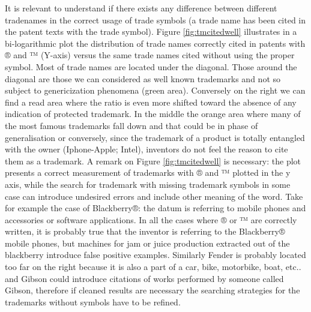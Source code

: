 \documentclass[b5paper,]{book}
\theoremstyle{definition}
\theoremstyle{definition}
\theoremstyle{definition}
\theoremstyle{remark}
\begin{document}
It is relevant to understand if there exists any difference between
different tradenames in the correct usage of trade symbols (a trade name
has been cited in the patent texts with the trade symbol). Figure
\ref{fig:tmcitedwell} illustrates in a bi-logarithmic plot the
distribution of trade names correctly cited in patents with ® and ™
(Y-axis) versus the same trade names cited without using the proper
symbol. Most of trade names are located under the diagonal. Those around
the diagonal are those we can considered as well known trademarks and
not so subject to genericization phenomena (green area). Conversely on
the right we can find a read area where the ratio is even more shifted
toward the absence of any indication of protected trademark. In the
middle the orange area where many of the most famous trademarks fall
down and that could be in phase of generalisation or conversely, since
the trademark of a product is totally entangled with the owner
(Iphone-Apple; Intel), inventors do not feel the reason to cite them as
a trademark. A remark on Figure \ref{fig:tmcitedwell} is necessary: the
plot presents a correct measurement of trademarks with ® and ™ plotted
in the y axis, while the search for trademark with missing trademark
symbols in some case can introduce undesired errors and include other
meaning of the word. Take for example the case of Blackberry®: the datum
is referring to mobile phones and accessories or software applications.
In all the cases where ® or ™ are correctly written, it is probably true
that the inventor is referring to the Blackberry® mobile phones, but
machines for jam or juice production extracted out of the blackberry
introduce false positive examples. Similarly Fender is probably located
too far on the right because it is also a part of a car, bike,
motorbike, boat, etc.. and Gibson could introduce citations of works
performed by someone called Gibson, therefore if cleaned results are
necessary the searching strategies for the trademarks without symbols
have to be refined.
\end{document}
